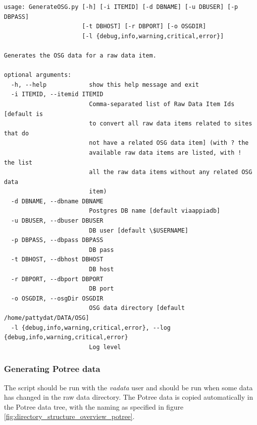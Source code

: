 \begin{Verbatim}[fontfamily=courier,commandchars=\\\{\},fontsize=\footnotesize]
usage: GenerateOSG.py [-h] [-i ITEMID] [-d DBNAME] [-u DBUSER] [-p DBPASS]
                      [-t DBHOST] [-r DBPORT] [-o OSGDIR]
                      [-l {debug,info,warning,critical,error}]

Generates the OSG data for a raw data item.

optional arguments:
  -h, --help            show this help message and exit
  -i ITEMID, --itemid ITEMID
                        Comma-separated list of Raw Data Item Ids [default is
                        to convert all raw data items related to sites that do
                        not have a related OSG data item] (with ? the
                        available raw data items are listed, with ! the list
                        all the raw data items without any related OSG data
                        item)
  -d DBNAME, --dbname DBNAME
                        Postgres DB name [default viaappiadb]
  -u DBUSER, --dbuser DBUSER
                        DB user [default \$USERNAME]
  -p DBPASS, --dbpass DBPASS
                        DB pass
  -t DBHOST, --dbhost DBHOST
                        DB host
  -r DBPORT, --dbport DBPORT
                        DB port
  -o OSGDIR, --osgDir OSGDIR
                        OSG data directory [default /home/pattydat/DATA/OSG]
  -l {debug,info,warning,critical,error}, --log {debug,info,warning,critical,error}
                        Log level
\end{Verbatim}

\subsubsection{Generating Potree data}
\label{sec:generatePotree} 
The script should be run with the \textit{vadata} user and should be run when some data
has changed in the raw data directory. The Potree data is copied automatically
in the Potree data tree, with the naming as specified in figure
\ref{fig:directory_structure_overview_potree}.


